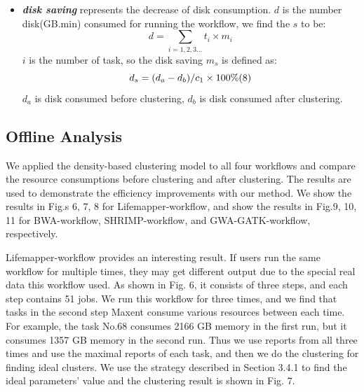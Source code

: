\documentclass[conference]{IEEEtran}
\begin{document}
\begin{itemize}
\item \textbf{\emph{disk saving}} represents the decrease of disk consumption. $d$ is the number disk(GB.min) consumed for running the workflow, we find the $s$ to be:
$$
d=\sum_{i=1,2,3...} t_i\times m_i
$$
$i$ is the number of task, so the disk saving $m_s$ is defined as:
$$
d_s=(d_a-d_b)/c_1\times100\%\relax{(8)}
$$
$d_a$ is disk consumed before clustering, $d_b$ is disk consumed after clustering.
\end{itemize}

\subsection{Offline Analysis}
We applied the density-based clustering model to all four workflows and compare the resource consumptions before clustering and after clustering. The results are used to demonstrate the efficiency improvements with our method. We show the results in Fig.s 6, 7, 8 for Lifemapper-workflow, and show the results in Fig.9, 10, 11 for BWA-workflow, SHRIMP-workflow, and GWA-GATK-workflow, respectively.

Lifemapper-workflow provides an interesting result. If users run the same workflow for multiple times, they may get different output due to the special real data this workflow used. As shown in Fig. 6, it consists of three steps, and each step contains 51 jobs. We run this workflow for three times, and we find that tasks in the second step Maxent consume various resources between each time. For example, the task No.68 consumes 2166 GB memory in the first run, but it consumes 1357 GB memory in the second run. Thus we use reports from all three times and use the maximal reports of each task, and then we do the clustering for finding ideal clusters. We use the strategy described in Section 3.4.1 to find the ideal parameters' value and the clustering result is shown in Fig. 7.
\end{document}
